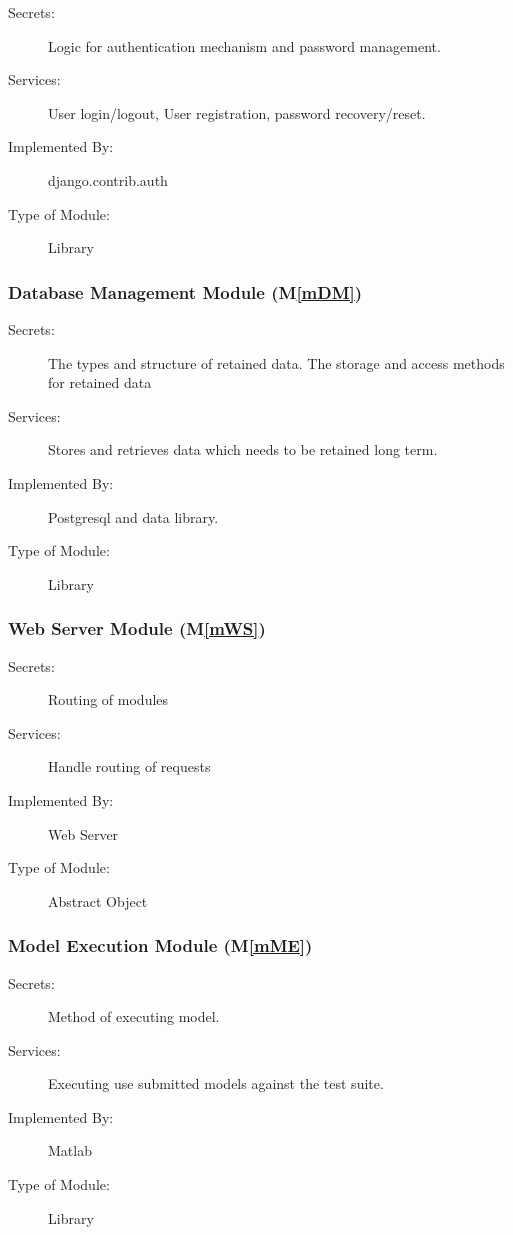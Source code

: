 \documentclass[12pt, titlepage]{article}
\newcommand{\mref}[1]{M\ref{#1}}
\begin{document}
\begin{description}
\item[Secrets:] Logic for authentication mechanism and password management. 
\item[Services:] User login/logout, User registration, password recovery/reset.
\item[Implemented By:] django.contrib.auth
\item[Type of Module:] Library
\end{description}

\subsubsection{Database Management Module (\mref{mDM})}

\begin{description}
\item[Secrets:]The types and structure of retained data. The storage and access methods for retained data
\item[Services:]Stores and retrieves data which needs to be retained long term.
\item[Implemented By:] Postgresql and data library.
\item[Type of Module:] Library
\end{description}

\subsubsection{Web Server Module (\mref{mWS})}

\begin{description}
\item[Secrets:] Routing of modules
\item[Services:] Handle routing of requests
\item[Implemented By:] Web Server
\item[Type of Module:] Abstract Object
\end{description}

\subsubsection{Model Execution Module (\mref{mME})}

\begin{description}
\item[Secrets:] Method of executing model. 
\item[Services:] Executing use submitted models against the test suite.
\item[Implemented By:] Matlab
\item[Type of Module:] Library
\end{description}
\end{document}
